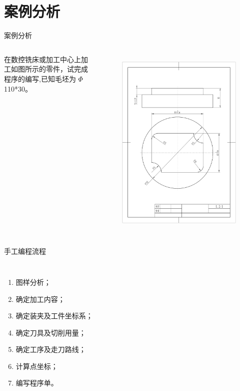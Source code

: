 \documentclass[UTF8,zihao=-4]{ctexbeamer}
\begin{document}
\section{案例分析}
\begin{frame}{案例分析}
     \begin{columns}
        在数控铣床或加工中心上加工如图所示的零件，试完成程序的编写,已知毛坯为 $\Phi$ 110*30。

\begin{figure}
    \centering
    \includegraphics[width=0.8\linewidth,trim=50 150 50 100,clip]{image/4-1.jpg}
    \label{fig:4-1}
\end{figure}
    \end{columns}
\end{frame}

\begin{frame}{手工编程流程}
    \begin{columns}
\begin{enumerate}
    \item 图样分析；
    \item 确定加工内容；
    \item 确定装夹及工件坐标系；
    \item 确定刀具及切削用量；
    \item 确定工序及走刀路线；
    \item 计算点坐标；
    \item 编写程序单。
\end{enumerate}
    \end{columns}
\end{frame}
\end{document}

